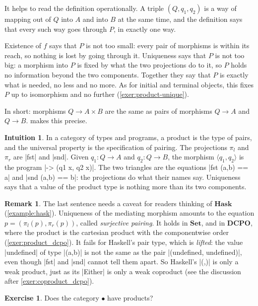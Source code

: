 \documentclass[a4paper,11pt, oneside,titlepage=false]{scrbook}
\theoremstyle{plain}
\theoremstyle{definition}
\newtheorem{rem}[thm]{Remark}
\newtheorem{exer}[thm]{Exercise}
\newtheorem{intu}[thm]{Intuition}
\newcommand{\Catb}[1]{\mathbf{#1}}
\newcommand{\SET}{\Catb{Set}}
\newcommand{\HASK}{\Catb{Hask}}
\newcommand{\DCPO}{\Catb{DCPO}}
\newcommand{\projl}{\ensuremath{\pi_l}}
\newcommand{\projr}{\ensuremath{\pi_r}}
\newcommand{\intoproduct}[2]{\ensuremath{\langle #1, #2 \rangle}}
\begin{document}
It helps to read the definition operationally.
A triple $(Q,q_1,q_2)$ is a way of mapping out of $Q$ into $A$ and into $B$ at
the same time, and the definition says that every such way goes through $P$, in
exactly one way.

Existence of $f$ says that $P$ is not too small: every pair of morphisms is
within its reach, so nothing is lost by going through it.
Uniqueness says that $P$ is not too big: a morphism into $P$ is fixed by what
the two projections do to it, so $P$ holds no information beyond the two
components.
Together they say that $P$ is exactly what is needed, no less and no more.
As for initial and terminal objects, this fixes $P$ up to isomorphism and no
further (\cref{exer:product-unique}).

In short: morphisms $Q \to A \times B$ are the same as pairs of morphisms
$Q \to A$ and $Q \to B$.
 makes this precise.

\begin{intu}
  In a category of types and programs, a product is the type of pairs, and the
  universal property is the specification of pairing.
  The projections $\projl$ and $\projr$ are |fst| and |snd|.
  Given $q_1 : Q \to A$ and $q_2 : Q \to B$, the morphism
  $\intoproduct{q_1}{q_2}$ is the program |\x -> (q1 x, q2 x)|.
  The two triangles are the equations |fst (a,b) == a| and |snd (a,b) == b|:
  the projections do what their names say.
  Uniqueness says that a value of the product type is nothing more than its two
  components.
\end{intu}

\begin{rem}
  The last sentence needs a caveat for readers thinking of $\HASK$
  (\cref{example:hask}).
  Uniqueness of the mediating morphism amounts to the equation
  $p = (\projl(p), \projr(p))$, called \emph{surjective pairing}.
  It holds in $\SET$, and in $\DCPO$, where the product is the cartesian
  product with the componentwise order (\cref{exer:product_dcpo}).
  It fails for Haskell's pair type, which is \emph{lifted}: the value
  |undefined| of type |(a,b)| is not the same as the pair
  |(undefined, undefined)|, even though |fst| and |snd| cannot tell them apart.
  So Haskell's |(,)| is only a weak product, just as its |Either| is only a
  weak coproduct (see the discussion after \cref{exer:coproduct_dcpo}).
\end{rem}

\begin{exer}
  Does the category $\bullet$ have products?
\end{exer}
\end{document}
